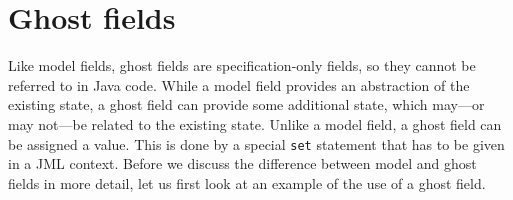 \documentclass{llncs}
\begin{document}
%
% 


\section{Ghost fields}
\label{Sec:ghost}


Like model fields, ghost fields are specification-only fields,
so they cannot be referred to in Java code.
While a model field provides an abstraction
of the existing state, a ghost field can provide some additional state,
which may---or may not---be related to the existing state.
Unlike a model field, a ghost field can
be assigned a value. This is done by a special \texttt{set} statement
that has to be given in a JML context.
Before we discuss the difference between model and ghost fields
in more detail, let us first look at an example of the use of a ghost field.
\end{document}

